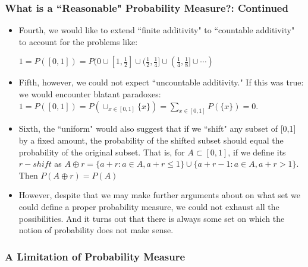 \documentclass[handout]{beamer}
\begin{document}
\frame
{
  \frametitle{What is a ``Reasonable" Probability Measure?: Continued }

   \begin{itemize}
   
 
  
 \item<1-> Fourth, we would like to extend  ``finite additivity" to ``countable additivity" to account for the problems like:
 
 $1=P([0,1])=P({0}\cup [1,\frac{1}{2}]\cup (\frac{1}{2}, \frac{1}{4}]\cup (\frac{1}{4},\frac{1}{8}] \cup \cdots )$

 
 
 \item<2-> Fifth, however, we could not expect ``uncountable additivity." If this was true: we would encounter blatant paradoxes: $1=P([0,1])=P(\cup_{x \in [0,1]} \{x\}) =\sum_{x\in [0,1]} P(\{x\})=0$.
 
  \item<3-> Sixth, the ``uniform" would also suggest that if we ``shift" any subset of [0,1] by a fixed amount, the probability of the shifted subset should equal the probability of the original subset. That is, for $A\subset [0,1]$, if we define its $r-shift$ as $A\oplus r=\{a+r: a\in A, a+r\leq 1\} \cup\{a+r-1: a\in A, a+r> 1\} $. Then $P(A\oplus r)=P(A)$

  
  \item<4-> However, despite that we may make further arguments about on what set we could define a proper probability measure, we could not exhaust all the possibilities. And it turns out that there is always some set on which the notion of probability does not make sense. 
  
    \end{itemize}
}




\subsubsection{A Limitation of Probability Measure}
\end{document}
